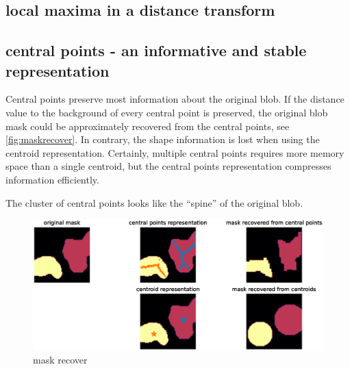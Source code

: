\subsection{local maxima in a distance transform}

\subsection{central points - an informative and stable representation}
Central points preserve most information about the original blob. If the distance value to the background of every central point is preserved, the original blob mask could be approximately recovered from the central points, see \autoref{fig:maskrecover}. In contrary, the shape information is lost when using the centroid representation. Certainly, multiple central points requires more memory space than a single centroid, but the central points representation compresses information efficiently.
 
The cluster of central points looks like the ``spine'' of the original blob.
\begin{figure}
  \centering
  \includegraphics[width=\textwidth]{figures/maskrecover.eps}
  \caption{mask recover}\label{fig:maskrecover}
\end{figure}

